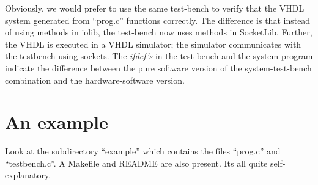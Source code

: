 \documentclass{article}
\begin{document}
Obviously, we would prefer to use the same test-bench
to verify that the VHDL system generated from ``prog.c'' 
functions correctly.  
The difference is that instead of using methods in iolib,
the test-bench now uses methods in SocketLib.  Further, the
VHDL is executed in a VHDL simulator; the simulator communicates
with the testbench using sockets.
The {\em ifdef's} in the test-bench and the system program
indicate the difference between the pure software version
of the system-test-bench combination and the hardware-software
version.  

\section{An example}

Look at the subdirectory ``example'' which contains the files ``prog.c'' and
``testbench.c''.  A Makefile and README are also present.  Its all quite
self-explanatory.
\end{document}
